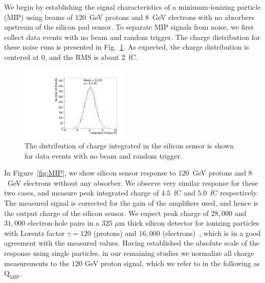 We begin by establishing the signal characteristics of a minimum-ionizing
particle (MIP) using beams of $120$~GeV protons and $8$~GeV electrons with no
absorbers upstream of the silicon pad sensor. To separate MIP signals from
noise, we first collect data events with no beam and random trigger. The charge
distribution for these noise runs is presented in Fig.~\ref{fig:noise}. As expected,
the charge distribution is centered at $0$, and the RMS is about
$2$~fC. 

\begin{figure}[htbp] 
\centering
\includegraphics[width=0.45\textwidth]{plots/NoiseNoBeam_charge.pdf} 
\caption{The distribution of charge integrated in the silicon sensor is shown for data events with no beam and random trigger. } 
\label{fig:noise} 
\end{figure} 

In Figure~\ref{fig:MIP}, we show silicon sensor response to $120$~GeV protons
and $8$~GeV electrons without any absorber. We observe very similar response for
these two cases, and measure peak integrated charge of $4.5$~fC and $5.0$~fC
respectively. The measured signal is corrected for the gain of the amplifiers
used, and hence is the output charge of the silicon sensor. We expect peak charge
of $28,000$ and $31,000$ electron-hole pairs in a $325$ $\mu$m thick silicon
detector for ionizing particles with Lorentz factor $\gamma=120$ (protons) and $16,000$
(electrons)~\cite{Agashe:2014kda}, which is in a good agreement with the measured
values. Having established the absolute scale of the response using single
particles, in our remaining studies we normalize all charge measurements to the
$120$ GeV proton signal, which we refer to in the following as
$\mathrm{Q}_{\mathrm{MIP}}$. 


